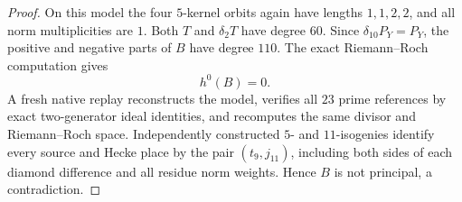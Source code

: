 \begin{proof}
On this model the four $5$-kernel orbits again have lengths
$1,1,2,2$, and all norm multiplicities are $1$.
Both $T$ and $\delta_2T$ have degree $60$.
Since $\delta_{10}P_Y=P_Y$, the positive and negative parts of
$B$ have degree $110$. The exact Riemann--Roch computation gives
\[
                              h^0(B)=0.
\]
A fresh native replay reconstructs the model, verifies all $23$
prime references by exact two-generator ideal identities, and
recomputes the same divisor and Riemann--Roch space.
Independently constructed $5$- and $11$-isogenies identify every
source and Hecke place by the pair $(t_9,j_{11})$, including both
sides of each diamond difference and all residue norm weights.
Hence $B$ is not principal, a contradiction.
\end{proof}
